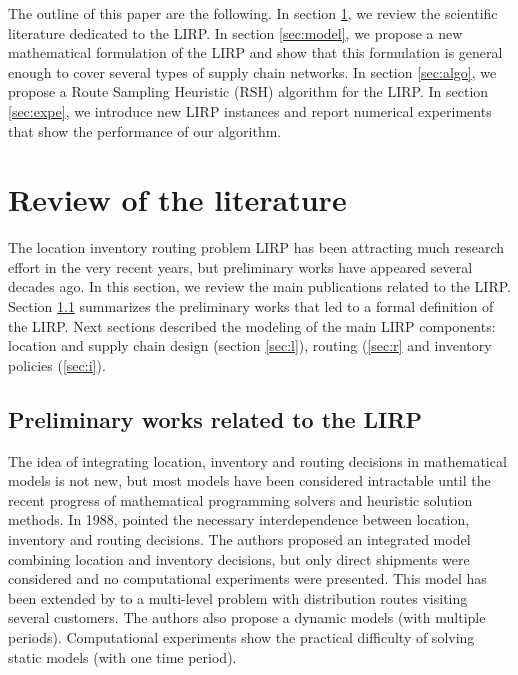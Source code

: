 \documentclass[a4paper,10pt]{article}
\begin{document}
\begin{linenumbers}
The outline of this paper are the following. 
In section \ref{sec:lit}, we review the scientific literature dedicated to the LIRP. 
In section \ref{sec:model}, we propose a new mathematical formulation of the LIRP and show that this formulation is general enough to cover several types of supply chain networks. 
In section \ref{sec:algo}, we propose a Route Sampling Heuristic (RSH) algorithm for the LIRP. 
In section \ref{sec:expe}, we introduce new LIRP instances and report numerical experiments that show the performance of our algorithm.




\section{Review of the literature} \label{sec:lit}

The location inventory routing problem LIRP has been attracting much research effort in the very recent years, but preliminary works have appeared several decades ago.  
In this section, we review the main publications related to the LIRP.
Section \ref{sec:almost} summarizes the preliminary works that led to a formal definition of the LIRP. 
Next sections described the modeling of the main LIRP components: location and supply chain design (section \ref{sec:l}), 
routing (\ref{sec:r} and inventory policies (\ref{sec:i}). 

\subsection{Preliminary works related to the LIRP}
\label{sec:almost}

 The idea of integrating location, inventory and routing decisions in mathematical models is not new, but most models have been considered intractable until the recent progress of mathematical programming solvers and heuristic solution methods. 
In 1988, \cite{PerSir88} pointed the necessary interdependence between location, inventory and routing decisions. 
The authors proposed an integrated model combining location and inventory decisions, but only direct shipments were considered and no computational experiments were presented. 
This model has been extended by \cite{AmbScu05} to a multi-level problem with distribution routes visiting several customers. The authors also propose a dynamic models (with multiple periods). Computational experiments show the practical difficulty of solving static models (with one time period). 



\end{linenumbers}
\end{document}
